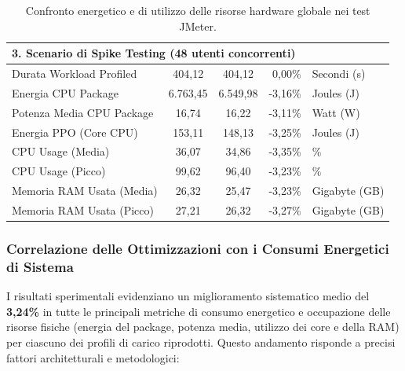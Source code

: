 \begin{table}[h!]
{\begin{tabular}{|l|c|c|r|l|}
        \multicolumn{5}{|l|}{\textbf{3. Scenario di Spike Testing (48 utenti concorrenti)}} \\ \hline
        Durata Workload Profiled & 404,12 & 404,12 & 0,00\% & Secondi (s) \\ \hline
        Energia CPU Package & 6.763,45 & 6.549,98 & -3,16\% & Joules (J) \\ \hline
        Potenza Media CPU Package & 16,74 & 16,22 & -3,11\% & Watt (W) \\ \hline
        Energia PPO (Core CPU) & 153,11 & 148,13 & -3,25\% & Joules (J) \\ \hline
        CPU Usage (Media) & 36,07 & 34,86 & -3,35\% & \% \\ \hline
        CPU Usage (Picco) & 99,62 & 96,40 & -3,23\% & \% \\ \hline
        Memoria RAM Usata (Media) & 26,32 & 25,47 & -3,23\% & Gigabyte (GB) \\ \hline
        Memoria RAM Usata (Picco) & 27,21 & 26,32 & -3,27\% & Gigabyte (GB) \\ \hline
    \end{tabular}
    }
    \caption{Confronto energetico e di utilizzo delle risorse hardware globale nei test JMeter.}
    \label{tab:jmeter_comparison_global}
\end{table}

\subsubsection{Correlazione delle Ottimizzazioni con i Consumi Energetici di Sistema}

I risultati sperimentali evidenziano un miglioramento sistematico medio del \textbf{3,24\%} in tutte le principali metriche di consumo energetico e occupazione delle risorse fisiche (energia del package, potenza media, utilizzo dei core e della RAM) per ciascuno dei profili di carico riprodotti. Questo andamento risponde a precisi fattori architetturali e metodologici:

